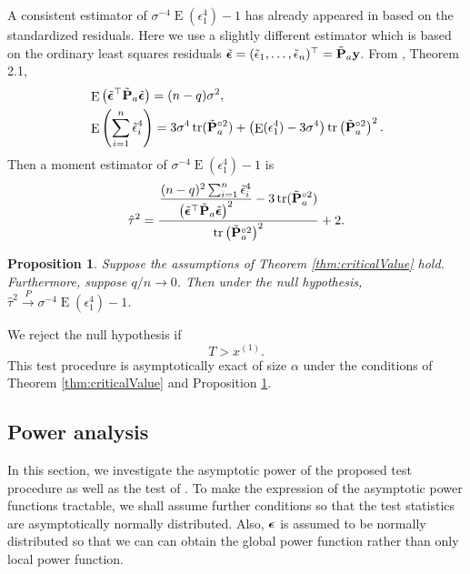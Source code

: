 \documentclass[11pt]{article}
\DeclareMathOperator{\mytr}{tr}
\DeclareMathOperator{\myE}{E}
\newcommand{\By}{\mathbf{y}}    \newcommand{\Bz}{\mathbf{z}}
\theoremstyle{plain}
\newtheorem{proposition}{\quad\quad Proposition}
\theoremstyle{definition}
\theoremstyle{remark}
\begin{document}
        A consistent estimator of $\sigma^{-4} \myE (\epsilon_1^4)-1$ has already appeared in \cite{Bai2017} based on the standardized residuals.
        Here we use a slightly different estimator which is based on the ordinary least squares residuals $\tilde \bepsilon=(\tilde \epsilon_1,\ldots, \tilde \epsilon_n)^\top= \tilde \BP_a \By$.
    From \cite{Bai2017}, Theorem 2.1, 
    \begin{align*}
        &\myE \left( \tilde \bepsilon^\top  \tilde \BP_a \tilde \bepsilon \right)
        = (n-q) \sigma^2,
        \\
        &\myE \left( \sum_{i=1}^n \tilde \epsilon_i^4 \right)
        =
        3\sigma^4 \mytr (\tilde \BP_a^{\circ 2}) 
        +\left( \myE (\epsilon_1^4)-3 \sigma^{4}\right)
        \mytr \left( \tilde \BP_a^{\circ 2}  \right)^2.
    \end{align*}
    Then a moment estimator of $\sigma^{-4}\myE (\epsilon_1^4)-1$ is 
\begin{equation*}
    \hat \tau^2 =
    \frac{
        \displaystyle\frac{(n-q)^2 \sum_{i=1}^n \tilde{\epsilon}_i^4}{\left( \tilde \bepsilon^\top \tilde \BP_a  \tilde \bepsilon \right)^2}
        - 3\mytr (\tilde \BP_a^{\circ 2})
    }{
        \mytr\left(  \tilde \BP_a^{\circ 2} \right)^2
    }
    +2.
\end{equation*}

\begin{proposition}\label{prop:estimation}
    Suppose the assumptions of Theorem \ref{thm:criticalValue} hold.
    Furthermore, suppose $q/n\to 0$.
    Then under the null hypothesis, $\hat \tau^2 \xrightarrow{P} \sigma^{-4} \myE (\epsilon_1^4)-1$.
\end{proposition}
We reject the null hypothesis if 
\begin{equation*}
    T > x^{(1)}.
\end{equation*}
This test procedure is asymptotically exact of size $\alpha$ under the conditions of Theorem \ref{thm:criticalValue} and Proposition \ref{prop:estimation}.


\subsection{Power analysis}\label{sec:Power}
In this section, we investigate the asymptotic power of the proposed test procedure as well as the test of \cite{Goeman2006}.
To make the expression of the asymptotic power functions tractable, we shall assume further conditions so that the test statistics are asymptotically normally distributed.
Also, $\boldsymbol{\epsilon}$ is assumed to be normally distributed so that we can can obtain the global power function rather than only local power function.
\end{document}
